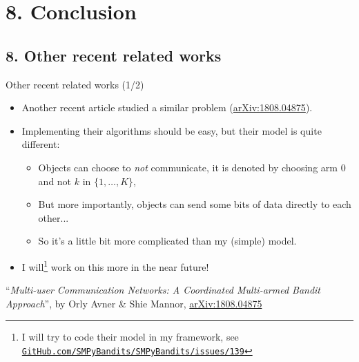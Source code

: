 \documentclass[12pt,english,ignorenonframetext,]{beamer}
\providecommand{\tightlist}{%
  \setlength{\itemsep}{0pt}\setlength{\parskip}{0pt}}
\begin{document}
\section{\hfill{}8. Conclusion\hfill{}}


\subsection{\hfill{}8. Other recent related works\hfill{}}

\begin{frame}{Other recent related works (1/2)}

\begin{itemize}\tightlist
\item
Another recent article studied a similar problem (\textcolor{blue}{\href{https://arxiv.org/abs/1808.04875}{arXiv:1808.04875}}).

\pause

\item
Implementing their algorithms should be easy, but their model is quite different:

  \begin{itemize}\tightlist
  \item
  Objects can choose to \emph{not} communicate, it is denoted by choosing arm $0$ and not $k$ in $\{1,\dots,K\}$,

  \item
  \danger{} But more importantly, objects can send some bits of data directly to each other...

  \item
  So it's a little bit more complicated than my (simple) model.
  \end{itemize}

\item
I will\footnote{\tiny I will try to code their model in my framework, see \href{https://github.com/SMPyBandits/SMPyBandits/issues/139}{\texttt{GitHub.com/SMPyBandits/SMPyBandits/issues/139}}}
work on this more in the near future!

\end{itemize}

\vfill{}
\begin{footnotesize}
  ``\emph{Multi-user Communication Networks: A Coordinated Multi-armed Bandit Approach}'',
  by Orly Avner \& Shie Mannor,
  \textcolor{blue}{\href{https://arxiv.org/abs/1808.04875}{arXiv:1808.04875}}
\end{footnotesize}

\end{frame}
\end{document}

